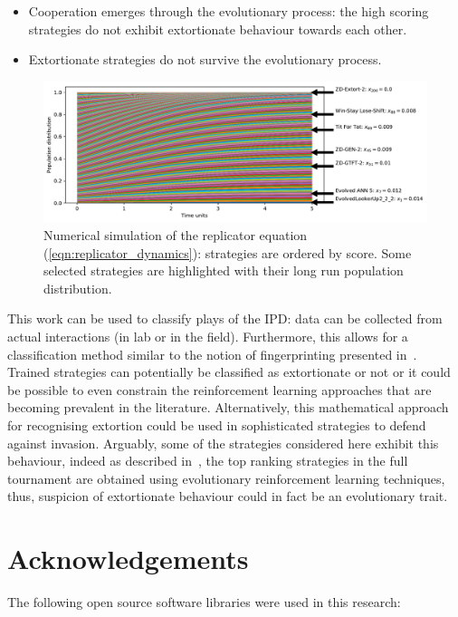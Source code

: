 \documentclass[a4paper]{article}
\begin{document}
\begin{itemize}
    \item Cooperation emerges through the evolutionary process: the high scoring
        strategies do not exhibit extortionate behaviour towards each other.
    \item Extortionate strategies do not survive the evolutionary process.
\end{itemize}

\begin{figure}[!htbp]
    \centering
    \includegraphics[width=.8\textwidth]{./assets/img/replicator_dynamics/main.pdf}
    \caption{Numerical simulation of the replicator equation
    (\ref{eqn:replicator_dynamics}): strategies are ordered by score. Some
    selected strategies are highlighted with their long run population
    distribution.}
    \label{fig:replicator_dynamics}
\end{figure}

This work can be used to classify plays of the IPD\@: data can be collected from
actual interactions (in lab or in the field). Furthermore, this allows for a
classification method similar to the notion of fingerprinting presented
in~\cite{Ashlock2008}. Trained strategies can potentially be classified as
extortionate or not or it could be possible to even constrain the reinforcement
learning approaches that are becoming prevalent in the literature.
Alternatively, this mathematical approach for recognising extortion could be
used in sophisticated strategies to defend against invasion. Arguably, some of
the strategies considered here exhibit this behaviour, indeed as described
in~\cite{Harper2017}, the top ranking strategies in the full tournament are
obtained using evolutionary reinforcement learning techniques, thus, suspicion
of extortionate behaviour could in fact be an evolutionary trait.

\section*{Acknowledgements}

The following open source software libraries were used in this research:
\end{document}
